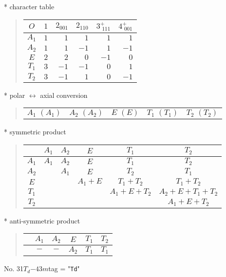 \documentclass[fleqn,10pt,landscape]{jsarticle}
\begin{document}
* character table
\begin{quote}
\begin{tabular}{crrrrr} \hline \hline
$ O $ & $ 1 $ & $ 2{}_{001} $ & $ 2{}_{110} $ & $ 3^{+}_{\,\,111} $ & $ 4^{+}_{\,\,001} $ \\ \hline
$ A_{1} $ & $ 1 $ & $ 1 $ & $ 1 $ & $ 1 $ & $ 1 $ \\
$ A_{2} $ & $ 1 $ & $ 1 $ & $ -1 $ & $ 1 $ & $ -1 $ \\
$ E $ & $ 2 $ & $ 2 $ & $ 0 $ & $ -1 $ & $ 0 $ \\
$ T_{1} $ & $ 3 $ & $ -1 $ & $ -1 $ & $ 0 $ & $ 1 $ \\
$ T_{2} $ & $ 3 $ & $ -1 $ & $ 1 $ & $ 0 $ & $ -1 $ \\
 \hline \hline
\end{tabular}
\end{quote}
* polar $\leftrightarrow$ axial conversion
\begin{quote}
\begin{tabular}{ccccc}
$ A_{1}\,\,(A_{1}) $ & $ A_{2}\,\,(A_{2}) $ & $ E\,\,(E) $ & $ T_{1}\,\,(T_{1}) $ & $ T_{2}\,\,(T_{2}) $
\end{tabular}
\end{quote}
* symmetric product
\begin{quote}
\begin{tabular}{c|ccccc} \hline \hline
 & $ A_{1} $ & $ A_{2} $ & $ E $ & $ T_{1} $ & $ T_{2} $ \\ \hline
$ A_{1} $ & $ A_{1} $ & $ A_{2} $ & $ E $ & $ T_{1} $ & $ T_{2} $ \\
$ A_{2} $ & $  $ & $ A_{1} $ & $ E $ & $ T_{2} $ & $ T_{1} $ \\
$ E $ & $  $ & $  $ & $ A_{1} + E $ & $ T_{1} + T_{2} $ & $ T_{1} + T_{2} $ \\
$ T_{1} $ & $  $ & $  $ & $  $ & $ A_{1} + E + T_{2} $ & $ A_{2} + E + T_{1} + T_{2} $ \\
$ T_{2} $ & $  $ & $  $ & $  $ & $  $ & $ A_{1} + E + T_{2} $ \\
 \hline \hline
\end{tabular}
\end{quote}
* anti-symmetric product
\begin{quote}
\begin{tabular}{cccccc} \hline \hline
 & $ A_{1} $ & $ A_{2} $ & $ E $ & $ T_{1} $ & $ T_{2} $ \\ \hline
$  $ & $ - $ & $ - $ & $ A_{2} $ & $ T_{1} $ & $ T_{1} $ \\
 \hline \hline
\end{tabular}
\end{quote}
\newpage
No. 31\quad$T_{d}$\quad$-43m$\quad[ cubic ]
tag = "{\tt Td}"
\end{document}
